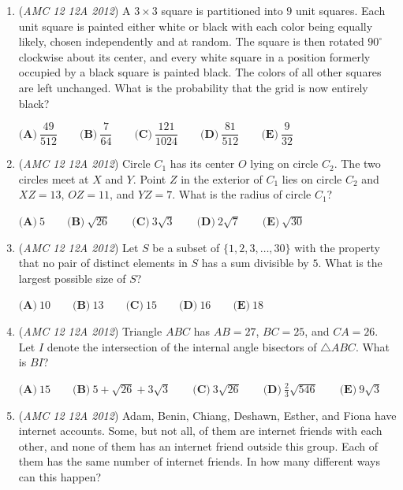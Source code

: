 \begin{enumerate}
$\textbf{(A)}\ 2\pi+6\qquad\textbf{(B)}\ 2\pi+4\sqrt3 \qquad\textbf{(C)}\ 3\pi+4 \qquad\textbf{(D)}\ 2\pi+3\sqrt3+2 \qquad\textbf{(E)}\ \pi+6\sqrt3$


	\item (\textit{AMC 12 12A 2012}) A $3\times3$ square is partitioned into $9$ unit squares.  Each unit square is painted either white or black with each color being equally likely, chosen independently and at random.  The square is then rotated $90^\circ$ clockwise about its center, and every white square in a position formerly occupied by a black square is painted black.  The colors of all other squares are left unchanged.  What is the probability that the grid is now entirely black?


 $\textbf{(A)}\ \dfrac{49}{512} \qquad\textbf{(B)}\ \dfrac{7}{64} \qquad\textbf{(C)}\ \dfrac{121}{1024} \qquad\textbf{(D)}\ \dfrac{81}{512} \qquad\textbf{(E)}\ \dfrac{9}{32}$


	\item (\textit{AMC 12 12A 2012}) Circle $C_1$ has its center $O$ lying on circle $C_2$.  The two circles meet at $X$ and $Y$.  Point $Z$ in the exterior of $C_1$ lies on circle $C_2$ and $XZ=13$, $OZ=11$, and $YZ=7$.  What is the radius of circle $C_1$?


 $\textbf{(A)}\ 5\qquad\textbf{(B)}\ \sqrt{26}\qquad\textbf{(C)}\ 3\sqrt{3}\qquad\textbf{(D)}\ 2\sqrt{7}\qquad\textbf{(E)}\ \sqrt{30}$


	\item (\textit{AMC 12 12A 2012}) Let $S$ be a subset of $\{1,2,3,\dots,30\}$ with the property that no pair of distinct elements in $S$ has a sum divisible by $5$.  What is the largest possible size of $S$?


 $\textbf{(A)}\ 10\qquad\textbf{(B)}\ 13\qquad\textbf{(C)}\ 15\qquad\textbf{(D)}\ 16\qquad\textbf{(E)}\ 18$


	\item (\textit{AMC 12 12A 2012}) Triangle $ABC$ has $AB=27$, $BC=25$, and $CA=26$.  Let $I$ denote the intersection of the internal angle bisectors of $\triangle ABC$.  What is $BI$?


 $\textbf{(A)}\ 15\qquad\textbf{(B)}\ 5+\sqrt{26}+3\sqrt{3}\qquad\textbf{(C)}\ 3\sqrt{26}\qquad\textbf{(D)}\ \frac{2}{3}\sqrt{546}\qquad\textbf{(E)}\ 9\sqrt{3}$


	\item (\textit{AMC 12 12A 2012}) Adam, Benin, Chiang, Deshawn, Esther, and Fiona have internet accounts.  Some, but not all, of them are internet friends with each other, and none of them has an internet friend outside this group.  Each of them has the same number of internet friends.  In how many different ways can this happen?



\end{enumerate}
